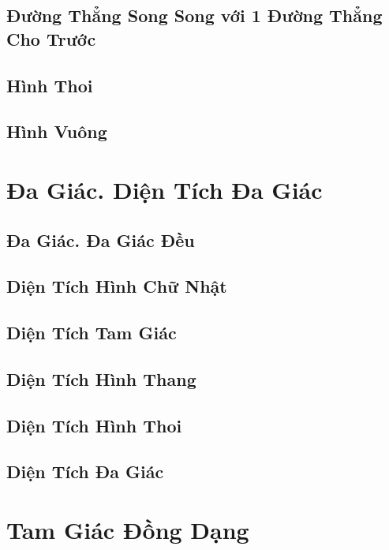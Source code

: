 \documentclass[oneside]{book}
\numberwithin{equation}{section}
\begin{document}
\section{Đường Thẳng Song Song với 1 Đường Thẳng Cho Trước}

\section{Hình Thoi}

\section{Hình Vuông}


\chapter{Đa Giác. Diện Tích Đa Giác}

\section{Đa Giác. Đa Giác Đều}

\section{Diện Tích Hình Chữ Nhật}

\section{Diện Tích Tam Giác}

\section{Diện Tích Hình Thang}

\section{Diện Tích Hình Thoi}

\section{Diện Tích Đa Giác}


\chapter{Tam Giác Đồng Dạng}
\end{document}
